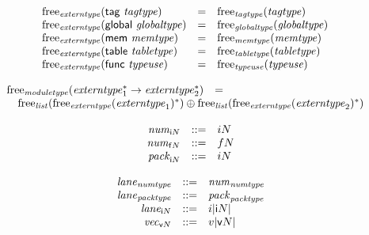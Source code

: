 $$
\begin{array}[t]{@{}lcl@{}l@{}}
{\mathrm{free}}_{\mathit{externtype}}(\mathsf{tag}~{\mathit{tagtype}}) & = & {\mathrm{free}}_{\mathit{tagtype}}({\mathit{tagtype}}) \\
{\mathrm{free}}_{\mathit{externtype}}(\mathsf{global}~{\mathit{globaltype}}) & = & {\mathrm{free}}_{\mathit{globaltype}}({\mathit{globaltype}}) \\
{\mathrm{free}}_{\mathit{externtype}}(\mathsf{mem}~{\mathit{memtype}}) & = & {\mathrm{free}}_{\mathit{memtype}}({\mathit{memtype}}) \\
{\mathrm{free}}_{\mathit{externtype}}(\mathsf{table}~{\mathit{tabletype}}) & = & {\mathrm{free}}_{\mathit{tabletype}}({\mathit{tabletype}}) \\
{\mathrm{free}}_{\mathit{externtype}}(\mathsf{func}~{\mathit{typeuse}}) & = & {\mathrm{free}}_{\mathit{typeuse}}({\mathit{typeuse}}) \\
\end{array}
$$

$$
\begin{array}[t]{@{}lcl@{}l@{}}
{\mathrm{free}}_{\mathit{moduletype}}({{\mathit{externtype}}_1^\ast} \rightarrow {{\mathit{externtype}}_2^\ast}) & = & & \\
 \multicolumn{4}{@{}l@{}}{\quad
\begin{array}[t]{@{}l@{}}
{\mathrm{free}}_{\mathit{list}}({{\mathrm{free}}_{\mathit{externtype}}({\mathit{externtype}}_1)^\ast}) \oplus {\mathrm{free}}_{\mathit{list}}({{\mathrm{free}}_{\mathit{externtype}}({\mathit{externtype}}_2)^\ast}) \\
\end{array}
} \\
\end{array}
$$

\vspace{1ex}

$$
\begin{array}[t]{@{}lrrl@{}l@{}}
& {{\mathit{num}}}_{{\mathsf{i}}{N}} & ::= & {i}{N} \\
& {{\mathit{num}}}_{{\mathsf{f}}{N}} & ::= & {f}{N} \\
& {{\mathit{pack}}}_{{\mathsf{i}}{N}} & ::= & {i}{N} \\
\end{array}
$$

$$
\begin{array}[t]{@{}lrrl@{}l@{}}
& {{\mathit{lane}}}_{{\mathit{numtype}}} & ::= & {{\mathit{num}}}_{{\mathit{numtype}}} \\
& {{\mathit{lane}}}_{{\mathit{packtype}}} & ::= & {{\mathit{pack}}}_{{\mathit{packtype}}} \\
& {{\mathit{lane}}}_{{\mathsf{i}}{N}} & ::= & {i}{{|{\mathsf{i}}{N}|}} \\
& {{\mathit{vec}}}_{{\mathsf{v}}{N}} & ::= & {v}{{|{\mathsf{v}}{N}|}} \\
\end{array}
$$

